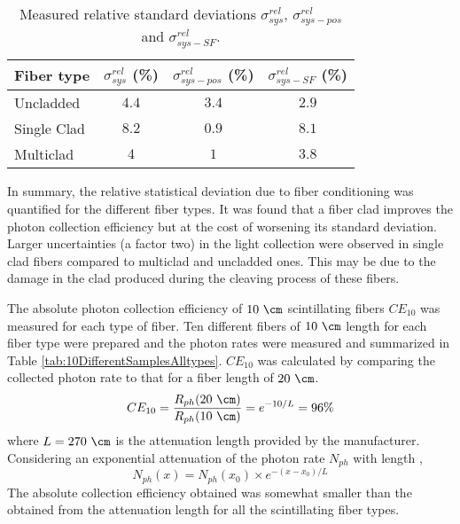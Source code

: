 \begin{table}[htbp]
\centering{}%
\begin{tabular}{lccc}
\toprule 
Fiber type & $\sigma^{rel}_{sys}$ (\%) & $\sigma^{rel}_{sys-pos}$ (\%) & $\sigma^{rel}_{sys-SF}$ (\%) \tabularnewline
\midrule
\midrule 
Uncladded & $4.4$ & $3.4$ & $2.9$ \tabularnewline
Single Clad & $8.2$ & $0.9$ & $8.1$ \tabularnewline
Multiclad & $4$ & $1$ & $3.8$ \tabularnewline
\bottomrule
\end{tabular}
\caption{Measured relative standard deviations $\sigma^{rel}_{sys}$, $\sigma^{rel}_{sys-pos}$ and $\sigma^{rel}_{sys-SF}$.}
\label{tab:RelativeStandardDeviations}
\end{table}

In summary, the relative statistical deviation due to fiber conditioning was quantified for the different fiber types. It was found that a fiber clad improves the photon collection efficiency but at the cost of worsening its standard deviation. Larger uncertainties (a factor two) in the light collection were observed in single clad fibers compared to multiclad and uncladded ones. This may be due to the damage in the clad produced during the cleaving process of these fibers. %

The absolute photon collection efficiency of $10~\cm$ scintillating fibers $CE_{10}$ was measured for each type of fiber. Ten different fibers of $10~\cm$ length for each fiber type were prepared and the photon rates were measured and summarized in Table \ref{tab:10DifferentSamplesAlltypes}. $CE_{10}$ was calculated by comparing the collected photon rate to that for a fiber length of $20~\cm$. 
\begin{equation}
CE_{10}=\frac{R_{ph}(20~\cm)}{R_{ph}(10~\cm)}=e^{-10/L}=96\%
\label{eq:CollectionEfficiency}
\end{equation}
where $L=270~\cm$ is the attenuation length provided by the manufacturer. Considering an exponential attenuation of the photon rate $N_{ph}$ with length \cite{Leo},
\begin{equation}
N_{ph}(x) = N_{ph}(x_0) \times e^{-(x-x_0)/L}
\label{eq:ExponentialAttenuation}
\end{equation}
The absolute collection efficiency obtained was somewhat smaller than the obtained from the attenuation length for all the scintillating fiber types.

